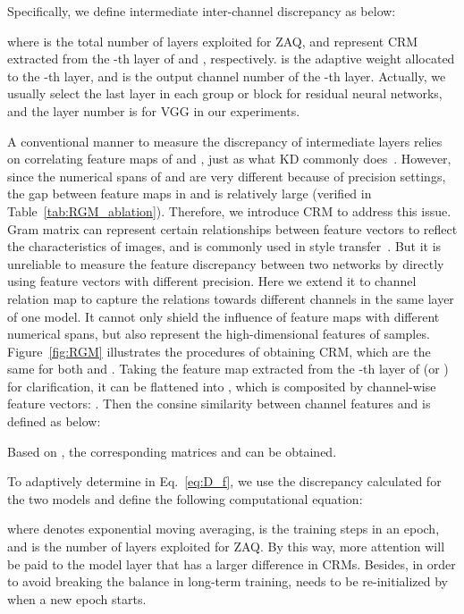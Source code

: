 \documentclass[final]{cvpr}
\begin{document}
Specifically, we define intermediate inter-channel discrepancy as below:

where  is the total number of layers exploited for ZAQ,  and  represent CRM extracted from the -th layer of  and , respectively.
 is the adaptive weight allocated to the -th layer, and  is the output channel number of the -th layer. 
Actually, we usually select the last layer in each group or block for residual neural networks, and the layer number is  for VGG in our experiments.  

A conventional manner to measure the discrepancy of intermediate layers relies on correlating feature maps of  and , just as what KD commonly does~\cite{RomeroBKCGB14,zagoruyko2016paying}.
However, since the numerical spans of  and  are very different because of precision settings, the gap between feature maps in  and  is relatively large (verified in Table~\ref{tab:RGM_ablation}).
Therefore, we introduce CRM to address this issue.
Gram matrix can represent certain relationships between feature vectors to reflect the characteristics of images, and is commonly used in style transfer~\cite{gatys2015neural}. But it is unreliable to measure the feature discrepancy between two networks by directly using feature vectors with different precision. 
Here we extend it to channel relation map to capture the relations towards different channels in the same layer of one model.
It cannot only shield the influence of feature maps with different numerical spans, but also represent the high-dimensional features of samples.
Figure~\ref{fig:RGM} illustrates the procedures of obtaining CRM, which are the same for both  and .
Taking the feature map  extracted from the -th layer of  (or ) for clarification, it can be flattened into , which is composited by  channel-wise feature vectors: .
Then the consine similarity between channel features  and  is defined as below:

Based on  , the corresponding matrices  and  can be obtained. 

To adaptively determine  in Eq.~\ref{eq:D_f}, we use the discrepancy calculated for the two models and define the following computational equation:
\begin{smaller}
  
\end{smaller}
where  denotes exponential moving averaging,  is the training steps in an epoch, and  is the number of layers exploited for ZAQ.
By this way, more attention will be paid to the model layer that has a larger difference in CRMs.
Besides, in order to avoid breaking the balance in long-term training,  needs to be re-initialized by  when a new epoch starts.
\end{document}

